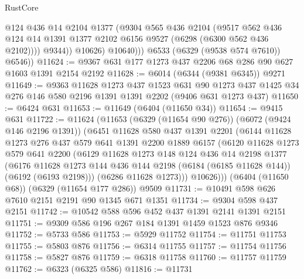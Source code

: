 \begin{lexlean}{RustCore}
\begin{coremodule}
                    @124
                    @436
                    @14
                    @2104
                    @1377
                    (@9304
                      @565
                      @436
                      @2104
                      (@9517
                        @562
                        @436
                        @124
                        @14
                        @1391
                        @1377
                        @2102
                        @6156
                        @9527
                        (@6298 (@6300 @562 @436 @2102))))
                    @9344))
                @10626)
              @10640)))
        @6533
        (@6329 (@9538 @574 @7610))
        @6546))
@11624 := @9367 @631 @177 @1273 @437 @2206 @68 @286 @90 @627 @1603 @1391 @2154 @2192
@11628 := @6014 (@6344 (@9381 @6345)) @9271
@11649 := @9363
    @11628
    @1273
    @437
    @1523
    @631
    @90
    @1273
    @437
    @1425
    @34
    @276
    @146
    @580
    @2196
    @1391
    @1391
    @2202
    (@9406 @631 @1273 @437)
@11650 := @6424 @631
@11653 := @11649 (@6404 (@11650 @34))
@11654 := @9415 @631
@11722 := @11624
    (@11653
      (@6329 (@11654 @90 @276))
      (@6072 (@9424 @146 @2196 @1391))
      (@6451
        @11628
        @580
        @437
        @1391
        @2201
        (@6144
          @11628
          @1273
          @276
          @437
          @579
          @641
          @1391
          @2200
          @1889
          @6157
          (@6120
            @11628
            @1273
            @579
            @641
            @2200
            (@6129
              @11628
              @1273
              @148
              @124
              @436
              @14
              @2198
              @1377
              (@6176
                @11628
                @1273
                @144
                @436
                @144
                @2198
                (@6184 (@6185 @11628 @144))
                (@6192 (@6193 @2198)))
              (@6286 @11628 @1273)))
          @10626)))
    (@6404 (@11650 @68))
    (@6329 (@11654 @177 @286))
    @9509
@11731 := @10491 @598 @626 @7610 @2151 @2191 @90 @1345 @671 @1351
@11734 := @9304 @598 @437 @2151
@11742 := @10542 @588 @596 @452 @437 @1391 @2141 @1391 @2151
@11751 := @9309 @586 @196 @267 @184 @1391 @1459 @1523 @876 @9346
@11752 := @5733 @586
@11753 := @5929 @11752
@11754 := @11751 @11753
@11755 := @5803 @876
@11756 := @6314 @11755
@11757 := @11754 @11756
@11758 := @5827 @876
@11759 := @6318 @11758
@11760 := @11757 @11759
@11762 := @6323 (@6325 @586)
@11816 := @11731

\end{coremodule}
\end{lexlean}
